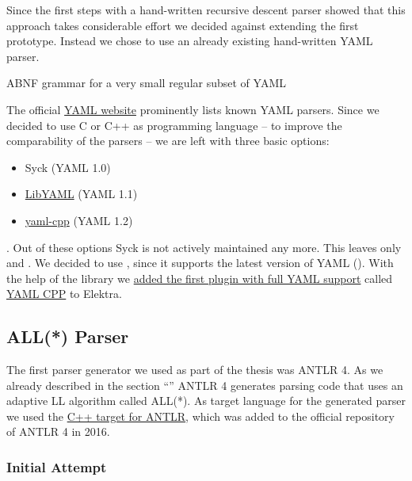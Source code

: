 Since the first steps with a hand-written recursive descent parser showed that this approach takes considerable effort we decided against extending the first prototype. Instead we chose to use an already existing hand-written YAML parser.

\begin{listing}
  \centering
  \begin{code-boxed}
    
  \end{code-boxed}
  \caption{ABNF grammar for a very small regular subset of YAML}
  \label{cod:abnf_recurive_descent}
\end{listing}

The official \href{http://yaml.org}{YAML website} prominently lists known YAML parsers. Since we decided to use C or C++ as programming language – to improve the comparability of the parsers – we are left with three basic options:

\begin{itemize}
  \item Syck (YAML 1.0)
  \item \href{https://github.com/yaml/libyaml}{LibYAML} (YAML 1.1)
  \item \href{https://github.com/jbeder/yaml-cpp}{yaml-cpp} (YAML 1.2)
\end{itemize}

. Out of these options Syck is not actively maintained any more. This leaves only  and . We decided to use , since it supports the latest version of YAML (). With the help of the library we \href{https://github.com/ElektraInitiative/libelektra/pull/1613}{added the first plugin with full YAML support} called \href{https://www.libelektra.org/plugins/yamlcpp}{YAML CPP} to Elektra.

\subsection{ALL(*) Parser}

The first parser generator we used as part of the thesis was \gls{ANTLR} 4. As we already described in the section “” ANTLR 4 generates parsing code that uses an adaptive LL algorithm called ALL(*). As target language for the generated parser we used the \href{https://github.com/antlr/antlr4/pull/1210}{C++ target for ANTLR}, which was added to the official repository of ANTLR 4 in 2016.

\subsubsection{Initial Attempt}

